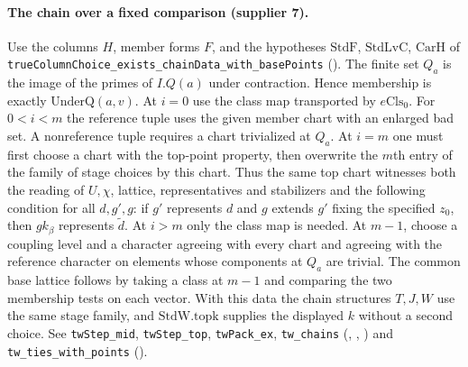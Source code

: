 \paragraph{The chain over a fixed comparison (supplier 7).}
Use the columns $H$, member forms $F$, and the hypotheses
$\mathrm{StdF}$, $\mathrm{StdLvC}$, $\mathrm{CarH}$ of
\nolinkurl{trueColumnChoice_exists_chainData_with_basePoints}
().
The finite set $Q_a$ is the image of the primes of $I.Q(a)$ under
contraction. Hence membership is exactly $\mathrm{UnderQ}(a,v)$.
At $i=0$ use the class map transported by $e\mathrm{Cls}_0$.
For $0<i<m$ the reference tuple uses the given member chart with an enlarged
bad set. A nonreference tuple requires a chart trivialized at $Q_a$.
At $i=m$ one must first choose a chart with the top-point property, then
overwrite the $m$th entry of the family of stage choices by this chart.
Thus the same top chart witnesses both the reading of $U,\chi$, lattice,
representatives and stabilizers and the following condition for all $d,g',g$:
if $g'$ represents $d$ and $g$ extends $g'$ fixing the specified $z_0$, then
$g k_\beta$ represents $\widetilde d$.
At $i>m$ only the class map is needed. At $m-1$, choose a coupling level and
a character agreeing with every chart and agreeing with the reference
character on elements whose components at $Q_a$ are trivial. The common
base lattice follows by taking a class at $m-1$ and comparing the two
membership tests on each vector. With this data the chain structures
$T,J,W$ use the same stage family, and $\mathrm{StdW}.\mathrm{topk}$
supplies the displayed $k$ without a second choice.
See \nolinkurl{twStep_mid}, \nolinkurl{twStep_top}, \nolinkurl{twPack_ex},
\nolinkurl{tw_chains} (,
,
) and
\nolinkurl{tw_ties_with_points}
().

